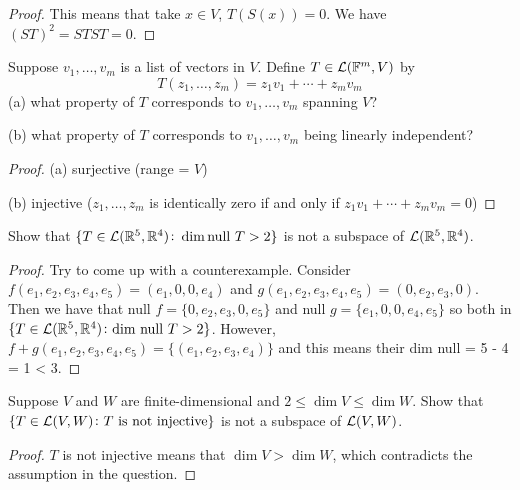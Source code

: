 \documentclass{extarticle}
\begin{document}
\begin{proof}
This means that take \(x \in V\), \(T (S(x)) = 0 \). We have \((ST)^2 = STST = 0\). 
\end{proof}

\begin{problem}{3}
    Suppose \(v_1, \ldots, v_m\) is a list of vectors in \(V\). Define 
    \(T \in \mathcal{L} (\mathbb{F}^m, V)\) by 
    \[T(z_1, \ldots, z_m) = z_1 v_1 + \cdots + z_m v_m\]
    (a) what property of \(T\) corresponds to \(v_1, \ldots, v_m\) spanning 
    \(V\)?

    (b) what property of \(T\) corresponds to \(v_1, \ldots, v_m\) being linearly 
    independent?
\end{problem}

\begin{proof}
(a) surjective (range = \(V\)) 

(b) injective (\(z_1, \ldots, z_m \) is identically zero if and only if 
\(z_1 v_1 + \cdots + z_m v_m = 0\))
\end{proof}

\begin{problem}{4}
    Show that \(\{T \in \mathcal{L}(\mathbb{R}^5, \mathbb{R}^4) \colon \dim \text{null } T > 2\}\)
    is not a subspace of \(\mathcal{L}(\mathbb{R}^5, \mathbb{R}^4)\).
\end{problem}

\begin{proof}
Try to come up with a counterexample. Consider \(f(e_1, e_2, e_3, e_4, e_5)
= (e_1, 0,0, e_4)\) and \(g(e_1, e_2, e_3, e_4, e_5) = (0, e_2, e_3, 0)\). Then 
we have that null \(f = \{0,e_2,e_3,0,e_5\}\) and null \(g = \{e_1, 0, 0, e_4, e_5\}\)
so both in \(\{T \in \mathcal{L}(\mathbb{R}^5, \mathbb{R}^4) \colon \text{dim null } T > 2\}\). However,
\(f + g (e_1, e_2, e_3, e_4, e_5) = \{(e_1,e_2,e_3,e_4)\}\) and this means 
their dim null = 5 - 4 = 1 < 3. 
\end{proof}

\begin{problem}{7}
    Suppose \(V\) and \(W\) are finite-dimensional and \(2 \leq \dim V 
    \leq \dim W\). Show that \(\{T \in \mathcal{L}(V, W) \colon T \text{ is 
    not injective}\}\) is not a subspace of \(\mathcal{L}(V, W)\). 
\end{problem}

\begin{proof}
\(T\) is not injective means that \(\dim V > \dim W \), which contradicts the 
assumption in the question. 
\end{proof}
\end{document}
